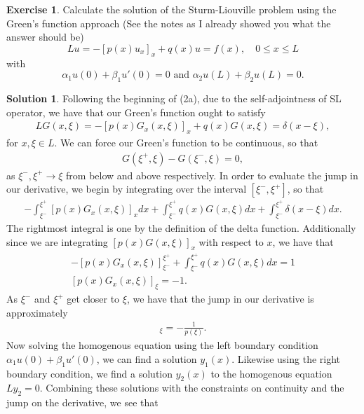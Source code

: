 \documentclass[12pt]{article}
\theoremstyle{definition}
\newtheorem{exer}{Exercise}
\newtheorem{sol}{Solution}
\theoremstyle{remark}
\begin{document}
\begin{exer}
Calculate the solution of the Sturm-Liouville problem using the Green’s function approach (See the notes as I already showed you what the answer should be)
\begin{equation*}
    Lu = -[ p(x) u_{x} ]_{x} + q(x) u = f(x), \quad 0\leq x \leq L
\end{equation*}
with 
\begin{equation*}
    \alpha_{1} u(0) + \beta_{1} u'(0) = 0 \text{ and } \alpha_{2} u(L) + \beta_{2} u(L) = 0.
\end{equation*}
\end{exer}
 \begin{sol}
     Following the beginning of (2a), due to the self-adjointness of SL operator, we have that our Green's function ought to satisfy
     \begin{align*}
         L G(x,\xi) = - [p(x) G_{x}(x,\xi)]_{x} + q(x)G(x,\xi) = \delta(x - \xi),
     \end{align*}
     for $x,\xi \in L$. We can force our Green's function to be continuous, so that
     \begin{align*}
         G(\xi^{+}, \xi) - G(\xi^{-}, \xi) = 0,
     \end{align*}
     as $\xi^{-},\xi^{+} \to \xi$ from below and above respectively. In order to evaluate the jump in our derivative, we begin by integrating over the interval $[\xi^{-}, \xi^{+}]$, so that
     \begin{align*}
         -\int_{\xi^{-}}^{\xi^{+}} [p(x)G_{x}(x,\xi)]_{x} dx + \int_{\xi^{-}}^{\xi^{+}} q(x)G(x, \xi) dx + \int_{\xi^{-}}^{\xi^{+}} \delta(x - \xi) dx.
     \end{align*}
     The rightmost integral is one by the definition of the delta function. Additionally since we are integrating $[p(x)G(x,\xi)]_{x}$ with respect to $x$, we have that
     \begin{align*}
         - [ p(x) G_{x}(x, \xi) ]_{\xi^{-}}^{\xi^{+}} +  \int_{\xi^{-}}^{\xi^{+}} q(x)G(x, \xi) dx = 1\\
         [p(x) G_{x}(x, \xi)]_{\xi} = -1.
     \end{align*}
     As $\xi^{-}$ and $\xi^{+}$ get closer to $\xi$, we have that the jump in our derivative is approximately
     \begin{align*}
         [G_{x}(x, \xi)]_{\xi} = -\frac{1}{p(\xi)}.
     \end{align*}
     Now solving the homogenous equation using the left boundary condition $\alpha_{1} u(0) + \beta_{1}u'(0)$, we can find a solution $y_{1}(x)$. Likewise using the right boundary condition, we find a solution $y_{2}(x)$ to the homogenous equation $L y_{2} = 0$. Combining these solutions with the constraints on continuity and the jump on the derivative, we see that

\end{sol}
\end{document}
